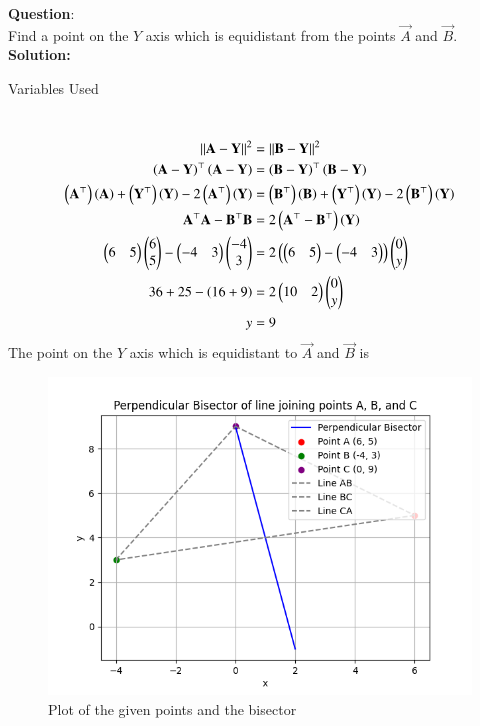 \documentclass[journal]{IEEEtran}
\begin{document}
\textbf{Question}:\\
Find a point on the $Y$ axis which is equidistant from the points  $\vec{A}$ and $\vec{B}$.
\\
\textbf{Solution: }
\begin{table}[h!]    
  \centering
  
  \caption{Variables Used}
  \label{tab10.5.3.9.1}
\end{table}\\
\begin{align}
\left\lVert\mathbf{A}-\mathbf{Y}\right\rVert^2&=\left\lVert\mathbf{B}-\mathbf{Y}\right\rVert^2\\
	\left(\mathbf{A}-\mathbf{Y}\right)^\top\left(\mathbf{A}-\mathbf{Y}\right)&=\left(\mathbf{B}-\mathbf{Y}\right)^\top\left(\mathbf{B}-\mathbf{Y}\right)\\
	\left(\mathbf{A}^\top\right)\left(\mathbf{A}\right)+\left(\mathbf{Y}^\top\right)\left(\mathbf{Y}\right)-2\left(\mathbf{A}^\top\right)\left(\mathbf{Y}\right)&=\left(\mathbf{B}^\top\right)\left(\mathbf{B}\right)+\left(\mathbf{Y}^\top\right)\left(\mathbf{Y}\right)-2\left(\mathbf{B}^\top\right)\left(\mathbf{Y}\right)\\
\mathbf{{A}^\top}\mathbf{A}-\mathbf{B^\top}\mathbf{B}&=2\left(\mathbf{A}^\top-\mathbf{B}^\top\right)\left(\mathbf{Y}\right)\\
\begin{pmatrix}6&5\end{pmatrix}\begin{pmatrix}6\\5\end{pmatrix}-\begin{pmatrix}-4&3\end{pmatrix}\begin{pmatrix}-4\\3\end{pmatrix}&=2\left(\begin{pmatrix}6&5\end{pmatrix}-\begin{pmatrix}-4&3\end{pmatrix}\right)\begin{pmatrix}0\\y\end{pmatrix}\\
36+25-\left(16+9\right)&=2\begin{pmatrix}10&2\end{pmatrix}\begin{pmatrix}0\\y\end{pmatrix}\\
y&=9
\end{align}
The point on the $Y$ axis which is equidistant to $\vec{A}$ and $\vec{B}$ is 
\begin{figure}[h!]
   \centering
   \includegraphics[width=0.7\linewidth]{figs/fig.png}
   \caption{Plot of the given points and the bisector}
   \label{stemplot}
\end{figure}  
\end{document}

